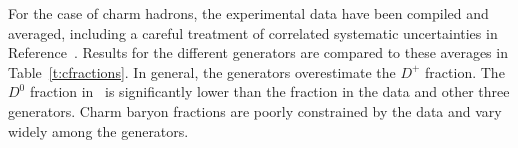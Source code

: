 For the case of charm hadrons, the experimental data have been
compiled and averaged, including a careful treatment of 
correlated systematic uncertainties in Reference~\cite{r:ffrac}.
Results for the different generators are compared to these averages
in Table~\ref{t:cfractions}.
In general, the generators overestimate the $D^+$ fraction. The $D^0$ fraction
in \Herwig\ is significantly lower than the fraction in the data and other three generators.
Charm baryon fractions 
are poorly constrained by the data and vary widely among the generators.


